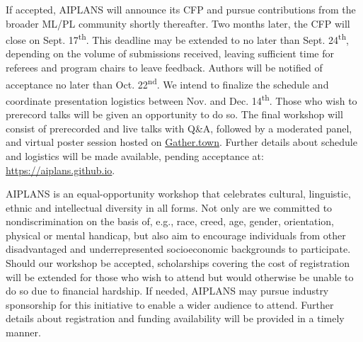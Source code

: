 \documentclass{article}
\begin{document}
    If accepted, AIPLANS will announce its CFP and pursue contributions from the broader ML/PL community shortly thereafter. Two months later, the CFP will close on Sept. 17\textsuperscript{th}. This deadline may be extended to no later than Sept. 24\textsuperscript{th}, depending on the volume of submissions received, leaving sufficient time for referees and program chairs to leave feedback. Authors will be notified of acceptance no later than Oct. 22\textsuperscript{nd}. We intend to finalize the schedule and coordinate presentation logistics between Nov. and Dec. 14\textsuperscript{th}. Those who wish to prerecord talks will be given an opportunity to do so. The final workshop will consist of prerecorded and live talks with Q\&A, followed by a moderated panel, and virtual poster session hosted on \href{https://gather.town}{Gather.town}. Further details about schedule and logistics will be made available, pending acceptance at: \url{https://aiplans.github.io}.

    AIPLANS is an equal-opportunity workshop that celebrates cultural, linguistic, ethnic and intellectual diversity in all forms. Not only are we committed to nondiscrimination on the basis of, e.g., race, creed, age, gender, orientation, physical or mental handicap, but also aim to encourage individuals from other disadvantaged and underrepresented socioeconomic backgrounds to participate. Should our workshop be accepted, scholarships covering the cost of registration will be extended for those who wish to attend but would otherwise be unable to do so due to financial hardship. If needed, AIPLANS may pursue industry sponsorship for this initiative to enable a wider audience to attend. Further details about registration and funding availability will be provided in a timely manner.


    \newpage
\end{document}
